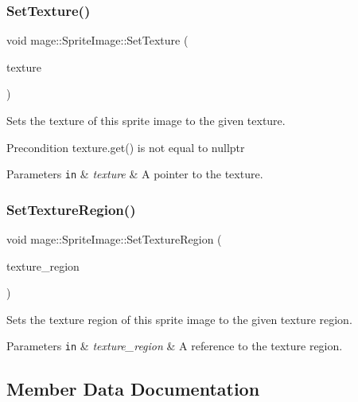 \subsubsection{\texorpdfstring{Set\+Texture()}{SetTexture()}}
{\footnotesize\ttfamily void mage\+::\+Sprite\+Image\+::\+Set\+Texture (\begin{DoxyParamCaption}\item[{\hyperlink{namespacemage_a1e01ae66713838a7a67d30e44c67703e}{Shared\+Ptr}$<$ \hyperlink{classmage_1_1_texture}{Texture} $>$}]{texture }\end{DoxyParamCaption})}

Sets the texture of this sprite image to the given texture.

\begin{DoxyPrecond}{Precondition}
{\ttfamily texture.\+get()} is not equal to {\ttfamily nullptr} 
\end{DoxyPrecond}

\begin{DoxyParams}[1]{Parameters}
\mbox{\tt in}  & {\em texture} & A pointer to the texture. \\
\hline
\end{DoxyParams}
\hypertarget{classmage_1_1_sprite_image_a99640fe6fc85d704f6a2831d0f663033}{}\label{classmage_1_1_sprite_image_a99640fe6fc85d704f6a2831d0f663033} 
\subsubsection{\texorpdfstring{Set\+Texture\+Region()}{SetTextureRegion()}}
{\footnotesize\ttfamily void mage\+::\+Sprite\+Image\+::\+Set\+Texture\+Region (\begin{DoxyParamCaption}\item[{const R\+E\+CT \&}]{texture\+\_\+region }\end{DoxyParamCaption})}

Sets the texture region of this sprite image to the given texture region.


\begin{DoxyParams}[1]{Parameters}
\mbox{\tt in}  & {\em texture\+\_\+region} & A reference to the texture region. \\
\hline
\end{DoxyParams}


\subsection{Member Data Documentation}
\hypertarget{classmage_1_1_sprite_image_a63331a3170f5af1a14b15913afc59ce2}{}\label{classmage_1_1_sprite_image_a63331a3170f5af1a14b15913afc59ce2} 
